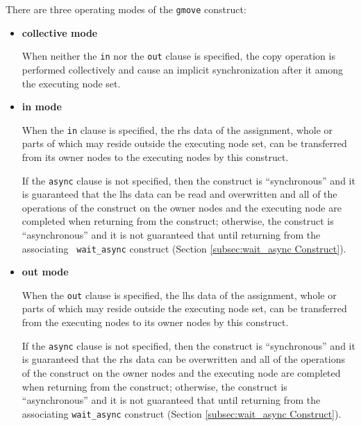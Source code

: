 
There are three operating modes of the {\tt gmove} construct:

\begin{itemize}
 \item {\bf collective mode}

       When neither the {\tt in} nor the {\tt out} clause is specified,
       the copy operation is performed collectively and cause an
       implicit synchronization after it among the executing node set.

%
%

 \item {\bf in mode}

       When the {\tt in} clause is specified, the rhs data of the
       assignment, whole or parts of which may reside outside the
       executing node set, can be transferred from its owner nodes to
       the executing nodes by this construct.

       If the {\tt async} clause is not specified, then the construct is
       ``synchronous'' and it is guaranteed that the lhs data
       can be read and overwritten and all of the operations of the
       construct on the owner nodes and the executing node
       are completed when returning from the construct;
       otherwise, the construct is ``asynchronous'' and it is not
       guaranteed that until returning from the associating {\tt
       wait\_async} construct (Section \ref{subsec:wait_async
       Construct}).

 \item {\bf out mode}

       When the {\tt out} clause is specified, the lhs data of the
       assignment, whole or parts of which may reside outside the 
       executing node set, can be transferred from the executing nodes
       to its owner nodes by this construct.

       If the {\tt async} clause is not specified, then the construct is
       ``synchronous'' and it is guaranteed that the rhs data
       can be overwritten and all of the operations of the construct on
       the owner nodes and the executing node are
       completed when returning from the construct; otherwise, the
       construct is ``asynchronous'' and it is not guaranteed that until
       returning from the associating {\tt wait\_async} construct
       (Section \ref{subsec:wait_async Construct}).

\end{itemize}

